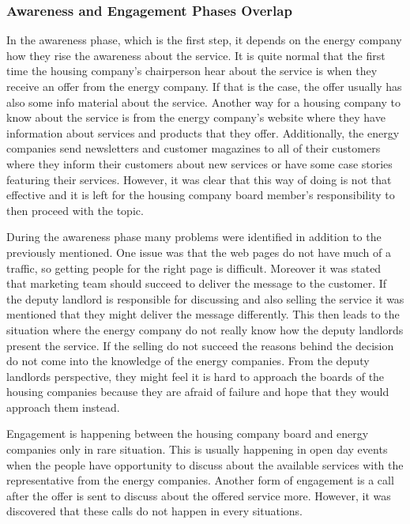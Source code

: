\subsubsection*{Awareness and Engagement Phases Overlap}

In the awareness phase, which is the first step, it depends on the energy company how they rise the awareness about the service. It is quite normal that the first time the housing company's chairperson hear about the service is when they receive an offer from the energy company. If that is the case, the offer usually has also some info material about the service. Another way for a housing company to know about the service is from the energy company's website where they have information about services and products that they offer. Additionally, the energy companies send newsletters and customer magazines to all of their customers where they inform their customers about new services or have some case stories featuring their services. However, it was clear that this way of doing is not that effective and it is left for the housing company board member's responsibility to then proceed with the topic.

During the awareness phase many problems were identified in addition to the previously mentioned. One issue was that the web pages do not have much of a traffic, so getting people for the right page is difficult. Moreover it was stated that marketing team should succeed to deliver the message to the customer. If the deputy landlord is responsible for discussing and also selling the service it was mentioned that they might deliver the message differently. This then leads to the situation where the energy company do not really know how the deputy landlords present the service. If the selling do not succeed the reasons behind the decision do not come into the knowledge of the energy companies. From the deputy landlords perspective, they might feel it is hard to approach the boards of the housing companies because they are afraid of failure and hope that they would approach them instead. 

Engagement is happening between the housing company board and energy companies only in rare situation. This is usually happening in open day events when the people have opportunity to discuss about the available services with the representative from the energy companies. Another form of engagement is a call after the offer is sent to discuss about the offered service more. However, it was discovered that these calls do not happen in every situations.

